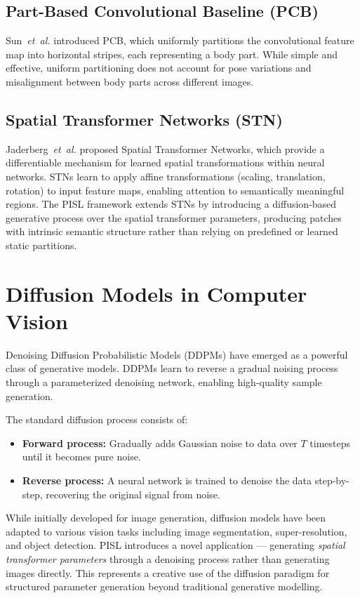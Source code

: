 \subsection{Part-Based Convolutional Baseline (PCB)}

Sun~\textit{et~al.} \cite{sun2018beyond} introduced PCB, which uniformly partitions the convolutional feature map into horizontal stripes, each representing a body part. While simple and effective, uniform partitioning does not account for pose variations and misalignment between body parts across different images.

\subsection{Spatial Transformer Networks (STN)}

Jaderberg~\textit{et~al.} \cite{jaderberg2015spatial} proposed Spatial Transformer Networks, which provide a differentiable mechanism for learned spatial transformations within neural networks. STNs learn to apply affine transformations (scaling, translation, rotation) to input feature maps, enabling attention to semantically meaningful regions. The PISL framework extends STNs by introducing a diffusion-based generative process over the spatial transformer parameters, producing patches with intrinsic semantic structure rather than relying on predefined or learned static partitions.

\section{Diffusion Models in Computer Vision}

Denoising Diffusion Probabilistic Models (DDPMs) \cite{ho2020denoising} have emerged as a powerful class of generative models. DDPMs learn to reverse a gradual noising process through a parameterized denoising network, enabling high-quality sample generation.

The standard diffusion process consists of:
\begin{itemize}
    \item \textbf{Forward process:} Gradually adds Gaussian noise to data over $T$ timesteps until it becomes pure noise.
    \item \textbf{Reverse process:} A neural network is trained to denoise the data step-by-step, recovering the original signal from noise.
\end{itemize}

While initially developed for image generation, diffusion models have been adapted to various vision tasks including image segmentation, super-resolution, and object detection. PISL \cite{tao2024unsupervised} introduces a novel application --- generating \textit{spatial transformer parameters} through a denoising process rather than generating images directly. This represents a creative use of the diffusion paradigm for structured parameter generation beyond traditional generative modelling.

